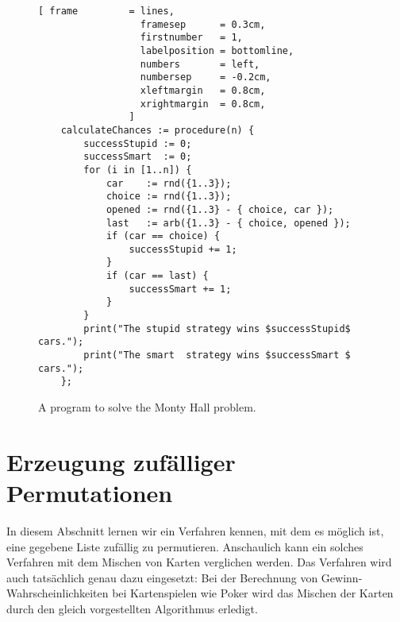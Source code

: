 \begin{figure}[!ht]
\centering
\begin{Verbatim}[ frame         = lines, 
                  framesep      = 0.3cm, 
                  firstnumber   = 1,
                  labelposition = bottomline,
                  numbers       = left,
                  numbersep     = -0.2cm,
                  xleftmargin   = 0.8cm,
                  xrightmargin  = 0.8cm,
                ]
    calculateChances := procedure(n) {
        successStupid := 0;  
        successSmart  := 0; 
        for (i in [1..n]) {
            car    := rnd({1..3});                       
            choice := rnd({1..3});                      
            opened := rnd({1..3} - { choice, car });   
            last   := arb({1..3} - { choice, opened });
            if (car == choice) {
                successStupid += 1;
            }
            if (car == last) {
                successSmart += 1;
            }
        }
        print("The stupid strategy wins $successStupid$ cars.");
        print("The smart  strategy wins $successSmart $ cars.");
    };
\end{Verbatim}
\vspace*{-0.3cm}
\caption{A program to solve the Monty Hall problem.}
\label{fig:monty-hall.stlx}
\end{figure}





\section[Permutations]{Erzeugung zuf\"alliger Permutationen}
In diesem Abschnitt lernen wir ein Verfahren kennen, mit dem es m\"oglich ist, eine gegebene
Liste zuf\"allig zu permutieren.  Anschaulich kann ein solches Verfahren mit dem Mischen von
Karten verglichen werden.  Das Verfahren wird auch tats\"achlich genau dazu eingesetzt:
Bei der Berechnung von Gewinn-Wahrscheinlichkeiten bei Kartenspielen wie Poker wird das
Mischen der Karten durch den gleich vorgestellten Algorithmus erledigt.  

